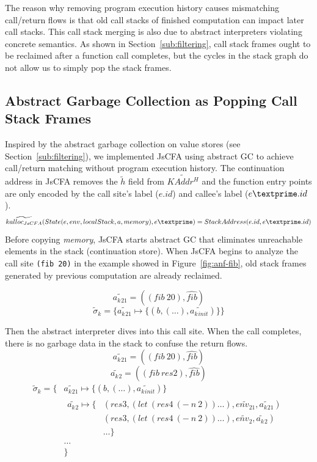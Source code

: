 \documentclass[12pt]{report}
\begin{document}
The reason why removing program execution history causes mismatching call/return flows is that old call stacks of finished computation can impact later call stacks. This call stack merging is also due to abstract interpreters violating concrete semantics. As shown in Section~\ref{sub:filtering}, call stack frames ought to be reclaimed after a function call completes, but the cycles in the stack graph do not allow us to simply pop the stack frames.

\subsection{Abstract Garbage Collection as Popping Call Stack Frames}
\label{subs:stack-gc}
Inspired by the abstract garbage collection on value stores (see Section~\ref{sub:filtering}), we implemented JsCFA using abstract GC to achieve call/return matching without program execution history. The continuation address in JsCFA removes the $\tilde{h}$ field from $\widetilde{KAddr^H}$ and the function entry points are only encoded by the call site's label ($e.id$) and callee's label ($e\textprime .id$).
\[
\widetilde{kalloc_{JsCFA}}(State(e, env, localStack, a, memory), e\textprime) = StackAddress(e.id, e\textprime .id)
\]
Before copying {\em memory}, JsCFA starts abstract GC that eliminates unreachable elements in the stack (continuation store).
When JsCFA begins to analyze the call site \verb|(fib 20)| in the example showed in Figure~\ref{fig:anf-fib}, old stack frames generated by previous computation are already reclaimed.

\[
\widetilde{a_k{}_{21}} = ((fib\ 20), \widehat{fib})
\]
\[
\tilde{\sigma}_k = \{\widetilde{a_k{}_{21}} \mapsto \{(b, (\dots), \widetilde{a_k{}_{init}}) \} \}
\]

Then the abstract interpreter dives into this call site. When the call completes, there is no garbage data in the stack to confuse the return flows.
\[
\widetilde{a_k{}_{21}} = ((fib\ 20), \widehat{fib})
\]
\[
\widetilde{a_k{}_{2}} = ((fib\ res2), \widehat{fib})
\]
\[
\begin{aligned}
\tilde{\sigma}_k = \{
                          {}& \widetilde{a_k{}_{21}} \mapsto \{(b, (\dots), \widetilde{a_k{}_{init}}) \} {}\\
                            &
                            \begin{aligned}
                              \widetilde{a_k{}_{2}} \mapsto
                              \{{}& (res3, (let\ (res4\ (-\ n\ 2)) \dots), \widetilde{env_{21}}, \widetilde{a_k{}_{21}}) {}\\
                              & (res3, (let\ (res4\ (-\ n\ 2)) \dots), \widetilde{env_2}, \widetilde{a_k{}_{2}}) {} \\
                              & \dots
                              \}
                            \end{aligned} {}\\
                            & \dots {}\\
                            & \}
\end{aligned}
\]
\end{document}
